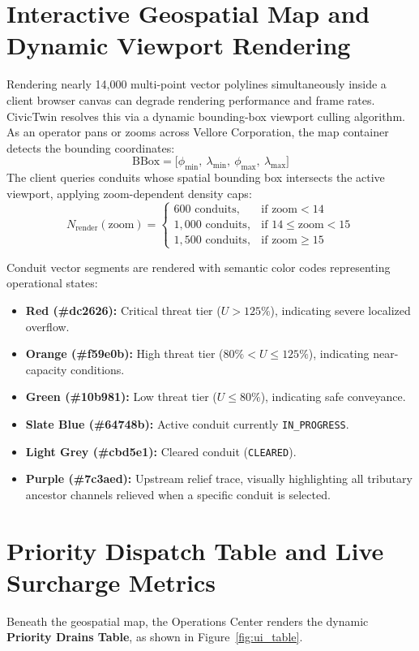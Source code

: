 \documentclass[12pt,a4paper]{report}
\begin{document}
\section{Interactive Geospatial Map and Dynamic Viewport Rendering}
Rendering nearly 14,000 multi-point vector polylines simultaneously inside a client browser canvas can degrade rendering performance and frame rates. CivicTwin resolves this via a dynamic bounding-box viewport culling algorithm. As an operator pans or zooms across Vellore Corporation, the map container detects the bounding coordinates:
\begin{equation}
\text{BBox} = \big[\phi_{\min},~\lambda_{\min},~\phi_{\max},~\lambda_{\max}\big]
\end{equation}
The client queries conduits whose spatial bounding box intersects the active viewport, applying zoom-dependent density caps:
\begin{equation}
N_{\text{render}}(\text{zoom}) = \begin{cases}
600 \text{ conduits}, & \text{if zoom} < 14 \\
1{,}000 \text{ conduits}, & \text{if } 14 \le \text{zoom} < 15 \\
1{,}500 \text{ conduits}, & \text{if zoom} \ge 15
\end{cases}
\end{equation}

Conduit vector segments are rendered with semantic color codes representing operational states:
\begin{itemize}
    \item \textbf{Red (\#dc2626):} Critical threat tier ($U > 125\%$), indicating severe localized overflow.
    \item \textbf{Orange (\#f59e0b):} High threat tier ($80\% < U \le 125\%$), indicating near-capacity conditions.
    \item \textbf{Green (\#10b981):} Low threat tier ($U \le 80\%$), indicating safe conveyance.
    \item \textbf{Slate Blue (\#64748b):} Active conduit currently \texttt{IN\_PROGRESS}.
    \item \textbf{Light Grey (\#cbd5e1):} Cleared conduit (\texttt{CLEARED}).
    \item \textbf{Purple (\#7c3aed):} Upstream relief trace, visually highlighting all tributary ancestor channels relieved when a specific conduit is selected.
\end{itemize}

\section{Priority Dispatch Table and Live Surcharge Metrics}
Beneath the geospatial map, the Operations Center renders the dynamic \textbf{Priority Drains Table}, as shown in Figure~\ref{fig:ui_table}.
\end{document}
